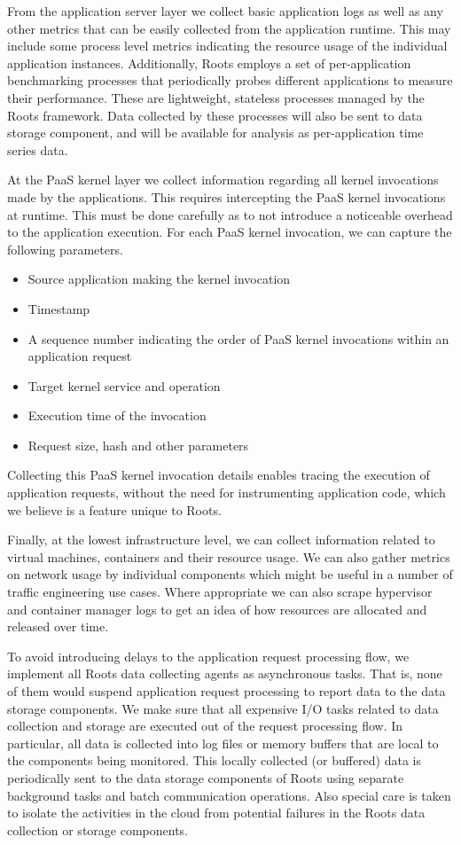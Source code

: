 From the application server layer we collect basic application logs as well as any other
metrics that can be easily collected from the application runtime. This may include some process level
metrics indicating the resource usage of the individual application instances. Additionally, Roots
employs a set of per-application benchmarking processes that periodically probes 
different applications
to measure their performance. These are lightweight, stateless processes managed by the Roots framework.
Data collected by these processes will also be sent to data storage component, and will be available
for analysis as per-application time series data. 

At the PaaS kernel layer we collect information regarding all kernel invocations
made by the applications. This requires intercepting the PaaS kernel invocations
at runtime. This must be done carefully as to not introduce a noticeable
overhead to the application execution. For each PaaS kernel invocation, we can capture the 
following parameters.
\begin{itemize}
\item Source application making the kernel invocation
\item Timestamp
\item A sequence number indicating the order of PaaS kernel invocations within an application request
\item Target kernel service and operation
\item Execution time of the invocation
\item Request size, hash and other parameters
\end{itemize}
Collecting this PaaS kernel invocation details enables tracing the execution of application 
requests, without the need for instrumenting application code, which we believe is a feature 
unique to Roots. 

Finally, at the lowest infrastructure level, we can collect information related to virtual machines, containers
and their resource usage. We can also gather metrics on network usage by individual components which
might be useful in a number of traffic engineering use cases. Where appropriate we can also scrape
hypervisor and container manager logs to get an idea of how resources are allocated and released over
time.

To avoid introducing delays to the application request processing flow, we implement
all Roots data collecting agents as asynchronous tasks. That is, none of them would
suspend application request processing to report data to the data storage components.
We make sure that all expensive I/O tasks related to data collection and storage are
executed out of the request processing flow.
In particular, all data is collected into log files or memory buffers that are local to the components being
monitored. This locally collected (or buffered) data is periodically sent
to the data storage components of Roots using separate background tasks and batch communication
operations. Also special care is taken to isolate the activities in the cloud from potential
failures in the Roots data collection or storage components.

